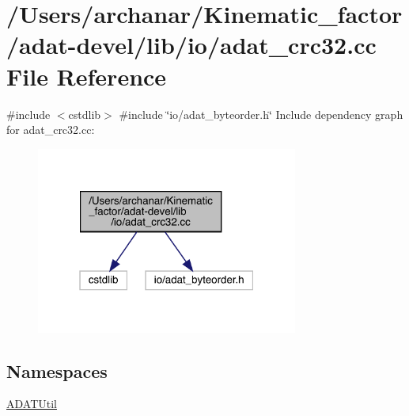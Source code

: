 \hypertarget{adat-devel_2lib_2io_2adat__crc32_8cc}{}\section{/\+Users/archanar/\+Kinematic\+\_\+factor/adat-\/devel/lib/io/adat\+\_\+crc32.cc File Reference}
\label{adat-devel_2lib_2io_2adat__crc32_8cc}
{\ttfamily \#include $<$cstdlib$>$}\newline
{\ttfamily \#include \char`\"{}io/adat\+\_\+byteorder.\+h\char`\"{}}\newline
Include dependency graph for adat\+\_\+crc32.\+cc\+:
\nopagebreak
\begin{figure}[H]
\begin{center}
\leavevmode
\includegraphics[width=244pt]{df/de3/adat-devel_2lib_2io_2adat__crc32_8cc__incl}
\end{center}
\end{figure}
\subsection*{Namespaces}
\begin{DoxyCompactItemize}
\item 
 \mbox{\hyperlink{namespaceADATUtil}{A\+D\+A\+T\+Util}}
\end{DoxyCompactItemize}

